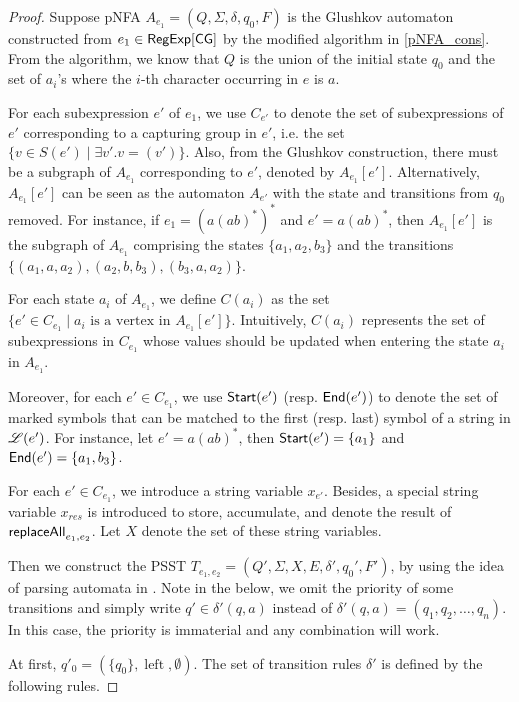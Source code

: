 \documentclass[sigplan,review,anonymous]{acmart}\settopmatter{printfolios=true,printccs=false,printacmref=false}
\newcommand{\tmop}[1]{\ensuremath{\operatorname{#1}}}
\newcommand\PSST{{\sf PSST}}
\newcommand\ssym{{\sf Start}}
\newcommand\esym{{\sf End}}
\begin{document}
\begin{proof}

Suppose pNFA $A_{e_1} =(Q, \Sigma,  \delta, q_0, F)$ is the Glushkov automaton constructed from $e_1 \in {\sf RegExp}[\sf CG]$ by the modified algorithm in \ref{pNFA_cons}. From the algorithm, we know that $Q$ is the union of the initial state $q_0$ and the set of $a_i$'s where the $i$-th character occurring in $e$ is $a$.

For each subexpression $e'$ of $e_1$, we use $C_{e'}$ to denote the set of subexpressions of $e'$ corresponding to a capturing group in $e'$, i.e. the set $\{v \in S(e')\mid \exists v'. v=(v')\}$. Also, from the Glushkov construction,
there must be a subgraph of $A_{e_1}$ corresponding to $e'$, denoted by $A_{e_1}[e']$. Alternatively, $A_{e_1}[e']$ can be seen as the automaton $A_{e'}$ with the state and transitions from $q_0$ removed. For instance, if $e_1 = (a (ab)^*)^*$ and $e' = a(ab)^*$, then $A_{e_1}[e']$ is the subgraph of $A_{e_1}$ comprising the states $\{a_1, a_2, b_3\}$ and the transitions $\{(a_1, a, a_2), (a_2, b, b_3), (b_3, a, a_2)\}$.

For each state $a_i$ of $A_{e_1}$, we define $C(a_i)$  as the set $\{ e' \in C_{e_1} \mid a_i \mbox{ is a vertex in }
A_{e_1}[e']\}$. Intuitively, $C(a_i)$ represents the set of subexpressions in $C_{e_1}$ whose values should be updated when entering the state $a_i$ in $A_{e_1}$. 

Moreover, for each $e' \in C_{e_1}$, we use $\ssym(e')$ (resp. $\esym(e')$) to denote the set of marked symbols that can be matched to the first  (resp. last) symbol of a string in $\mathscr{L}(e')$. For instance, let $e' = a(ab)^*$, then $\ssym(e') = \{a_1\}$ and $\esym(e') = \{a_1, b_3\}$. 

For each $e' \in C_{e_1}$, we introduce a string variable $x_{e'}$. Besides, a special string variable $x_{res}$ is introduced to store, accumulate, and denote the result of $\mathsf{replaceAll}_{e_1,e_2}$. Let $X$ denote the set of these string variables.


Then we construct the \PSST{} $T_{e_1,e_2} = (Q', \Sigma, X, E, \delta', q_0', F')$, by using the idea of parsing automata in \cite{CCH+18}. Note in the below, we omit the priority of some transitions and simply write $q' \in \delta'(q,a)$ instead of $\delta'(q,a)=(q_1,q_2,\ldots,q_n)$. In this case, the priority is immaterial and any combination will work.

At first, $q'_0= (\{ q_0
\}, \tmop{left}, \emptyset)$. The set of transition rules $\delta'$ is defined by the following rules.


\end{proof}
\end{document}
